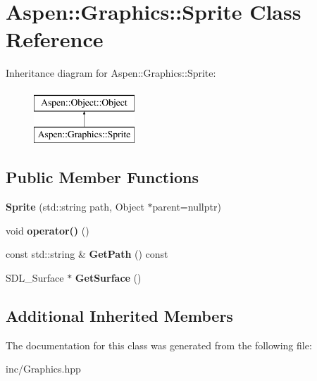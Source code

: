 \hypertarget{class_aspen_1_1_graphics_1_1_sprite}{\section{Aspen\-:\-:Graphics\-:\-:Sprite Class Reference}
\label{class_aspen_1_1_graphics_1_1_sprite}
}
Inheritance diagram for Aspen\-:\-:Graphics\-:\-:Sprite\-:\begin{figure}[H]
\begin{center}
\leavevmode
\includegraphics[height=2.000000cm]{d4/d38/class_aspen_1_1_graphics_1_1_sprite}
\end{center}
\end{figure}
\subsection*{Public Member Functions}
\begin{DoxyCompactItemize}
\item 
\hypertarget{class_aspen_1_1_graphics_1_1_sprite_a195d3d73ee898590e80029e2723a2011}{{\bfseries Sprite} (std\-::string path, Object $\ast$parent=nullptr)}\label{class_aspen_1_1_graphics_1_1_sprite_a195d3d73ee898590e80029e2723a2011}

\item 
\hypertarget{class_aspen_1_1_graphics_1_1_sprite_abaa66ca2d23fe08bc9b4941468bf9ebe}{void {\bfseries operator()} ()}\label{class_aspen_1_1_graphics_1_1_sprite_abaa66ca2d23fe08bc9b4941468bf9ebe}

\item 
\hypertarget{class_aspen_1_1_graphics_1_1_sprite_a465f0cab7f12bcf4c4ebc5de59446517}{const std\-::string \& {\bfseries Get\-Path} () const }\label{class_aspen_1_1_graphics_1_1_sprite_a465f0cab7f12bcf4c4ebc5de59446517}

\item 
\hypertarget{class_aspen_1_1_graphics_1_1_sprite_a4e2dbcf2dd4ec0760adb048b0713fa3c}{S\-D\-L\-\_\-\-Surface $\ast$ {\bfseries Get\-Surface} ()}\label{class_aspen_1_1_graphics_1_1_sprite_a4e2dbcf2dd4ec0760adb048b0713fa3c}

\end{DoxyCompactItemize}
\subsection*{Additional Inherited Members}


The documentation for this class was generated from the following file\-:\begin{DoxyCompactItemize}
\item 
inc/Graphics.\-hpp\end{DoxyCompactItemize}
